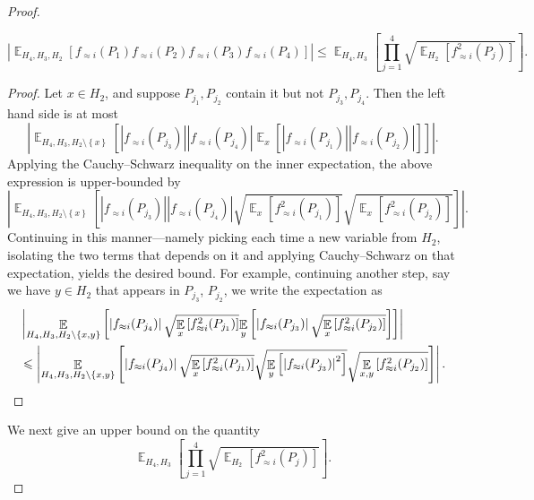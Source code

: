 \documentclass{toc}
\newcommand\card[1]{\left| {#1} \right|}
\newcommand\set[1]{{\left\{ #1 \right\}}}
\newcommand\Expect[2]{{\mathop{\mathbb{E}}_{#1}\left[ {#2} \right]}}
\renewcommand\leq{\leqslant}
\newcommand\approxlvlfn[2]{{#1}_{\approx{#2}}}
\begin{document}
\begin{proof}
\begin{claim}
\[
\card{
\Expect{H_{4},H_{3},H_{2}}{
\approxlvlfn{f}{i}(P_1)\approxlvlfn{f}{i}(P_2)\approxlvlfn{f}{i}(P_3)\approxlvlfn{f}{i}(P_4)}
}
\leq
\Expect{H_{4},H_{3}}{
\prod\limits_{j=1}^{4}
\sqrt{\Expect{H_{2}}{\approxlvlfn{f}{i}^2(P_j)}}
%
%
%
%
}.
\]
\end{claim}
\begin{proof}
Let $x\in H_{2}$, and suppose $P_{j_1},P_{j_2}$ contain it but not $P_{j_3},P_{j_4}$. Then the left
hand side is at most
\[
\card{
\Expect{H_{4},H_{3},H_{2}\setminus\set{x}}{
\card{\approxlvlfn{f}{i}(P_{j_3})}
\card{\approxlvlfn{f}{i}(P_{j_4})}
\Expect{x}{\card{\approxlvlfn{f}{i}(P_{j_1})}\card{\approxlvlfn{f}{i}(P_{j_2})}}
}}.
\]
Applying the Cauchy--Schwarz inequality on the inner expectation, the above expression is
upper-bounded by
\[
\card{
\Expect{H_{4},H_{3},H_{2}\setminus\set{x}}{
\card{\approxlvlfn{f}{i}(P_{j_3})}
\card{\approxlvlfn{f}{i}(P_{j_4})}
\sqrt{\Expect{x}{\approxlvlfn{f}{i}^2(P_{j_1})}}
\sqrt{\Expect{x}{\approxlvlfn{f}{i}^2(P_{j_2})}}}
}.
\]
Continuing in this manner---namely picking each time a new variable from $H_2$, isolating the two terms that depends
on it and applying Cauchy--Schwarz on that expectation, yields the desired bound. For example, continuing another step,
say we have $y\in H_2$ that appears in $P_{j_3}$, $P_{j_2}$, we write the expectation as
\begin{align*}
&\card{
\Expect{H_{4},H_{3},H_{2}\setminus\set{x,y}}{
\card{\approxlvlfn{f}{i}(P_{j_4})}
\sqrt{\Expect{x}{\approxlvlfn{f}{i}^2(P_{j_1})}}
\Expect{y}{\card{\approxlvlfn{f}{i}(P_{j_3})}
\sqrt{\Expect{x}{\approxlvlfn{f}{i}^2(P_{j_2})}}}
}}\\
&\leq
\card{
\Expect{H_{4},H_{3},H_{2}\setminus\set{x,y}}{
\card{\approxlvlfn{f}{i}(P_{j_4})}
\sqrt{\Expect{x}{\approxlvlfn{f}{i}^2(P_{j_1})}}
\sqrt{\Expect{y}{\card{\approxlvlfn{f}{i}(P_{j_3})}^2}}
\sqrt{\Expect{x,y}{\approxlvlfn{f}{i}^2(P_{j_2})}}
}}          \qedhere   %
.
\end{align*}
\end{proof}

We next give an upper bound on the quantity %
\begin{equation}\label{eq5}
\Expect{H_{4},H_{3}}{
\prod\limits_{j=1}^{4}
\sqrt{\Expect{H_{2}}{\approxlvlfn{f}{i}^2(P_j)}}}.
\end{equation}


\end{proof}
\end{document}
